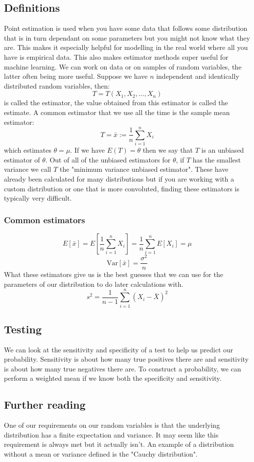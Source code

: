 \documentclass[12pt]{article}
\newcommand{\Var}[1]{\text{Var}[#1]}
\begin{document}
\subsection*{Definitions}
Point estimation is used when you have some data that follows some distribution that is in turn dependant on some parameters but you might not know what they are. This makes it especially helpful for modelling in the real world where all you have is empirical data. This also makes estimator methods super useful for machine learning. We can work on data or on samples of random variables, the latter often being more useful. Suppose we have \(n\) independent and identically distributed random variables, then:
\[T=T(X_1,X_2,...,X_n)\]
is called the estimator, the value obtained from this estimator is called the estimate. A common estimator that we use all the time is the sample mean estimator:
\[T=\bar{x}:=\frac{1}{n}\sum_{i=1}^nX_i\]
which estimates \(\theta=\mu\). If we have \(E(T)=\theta\) then we say that \(T\) is an unbiased estimator of \(\theta\). Out of all of the unbiased estimators for \(\theta\), if \(T\) has the smallest variance we call \(T\) the "minimum variance unbiased estimator". These have already been calculated for many distributions but if you are working with a custom distribution or one that is more convoluted, finding these estimators is typically very difficult.
\subsubsection*{Common estimators}
\[E[\bar{x}]=E\left[\frac{1}{n}\sum_{i=1}^nX_i\right]=\frac{1}{n}\sum_{i=1}^nE[X_i]=\mu\]
\[\Var{\bar{x}}=\frac{\sigma^2}{n}\]
What these estimators give us is the best guesses that we can use for the parameters of our distribution to do later calculations with.
\[s^2=\frac{1}{n-1}\sum_{i=1}^n\left(X_i-\bar{X}\right)^2\]
\subsection*{Testing}
We can look at the sensitivity and specificity of a test to help us predict our probability. Sensitivity is about how many true positives there are and sensitivity is about how many true negatives there are. To construct a probability, we can perform a weighted mean if we know both the specificity and sensitivity.
\subsection*{Further reading}
One of our requirements on our random variables is that the underlying distribution has a finite expectation and variance. It may seem like this requirement is always met but it actually isn't. An example of a distribution without a mean or variance defined is the "Cauchy distribution".
\end{document}
